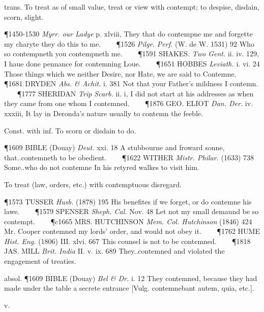 \begin{description}[wide, labelwidth=!, labelindent=0pt]
\begin{myenumerate}

 trans. To treat as of small value, treat or view with contempt; to despise, disdain, scorn, slight.

\P 1450-1530  \textit{Myrr. our Ladye} p. xlviii, They that do contempne me and forgette my charyte they do this to me.    
\P 1526  \textit{Pilgr. Perf.} (W. de W. 1531) 92 Who so contempneth you contempneth me.    
\P 1591 SHAKES.  \textit{Two Gent.} ii. iv. 129, I haue done pennance for contemning Loue.    
\P 1651 HOBBES  \textit{Leviath.} i. vi. 24 Those things which we neither Desire, nor Hate, we are said to Contemne.    
\P 1681 DRYDEN  \textit{Abs. \& Achit.} i. 381 Not that your Father's mildness I contemn.    
\P 1777 SHERIDAN  \textit{Trip Scarb.} ii. i, I did not start at his addresses as when they came from one whom I contemned.    
\P 1876 GEO. ELIOT  \textit{Dan. Der.} iv. xxxiii, It lay in Deronda's nature usually to contemn the feeble.

 Const. with inf. To scorn or disdain to do.

\P 1609 BIBLE (Douay)  \textit{Deut.} xxi. 18 A stubbourne and froward sonne, that..contemneth to be obedient.    
\P 1622 WITHER  \textit{Mistr. Philar.} (1633) 738 Some..who do not contemne In his retyred walkes to visit him.

 To treat (law, orders, etc.) with contemptuous disregard.

\P 1573 TUSSER  \textit{Husb.} (1878) 195 His benefites if we forget, or do contemne his lawe.    
\P 1579 SPENSER  \textit{Sheph. Cal.} Nov. 48 Let not my small demaund be so contempt.    
\P c1665 MRS. HUTCHINSON  \textit{Mem. Col. Hutchinson} (1846) 424 Mr. Cooper contemned my lords' order, and would not obey it.    
\P 1762 HUME  \textit{Hist. Eng.} (1806) III. xlvi. 667 This counsel is not to be contemned.    
\P 1818 JAS. MILL  \textit{Brit. India} II. v. ix. 689 They..contemned and violated the engagement of treaties.

absol. \P 1609 BIBLE (Douay)  \textit{Bel \& Dr.} i. 12 They contemned, because they had made under the table a secrete entrance [Vulg. contemnebant autem, quia, etc.].
\end{myenumerate}


 v.

\noindent {}

\vspace{-0.3cm}


\end{description}
